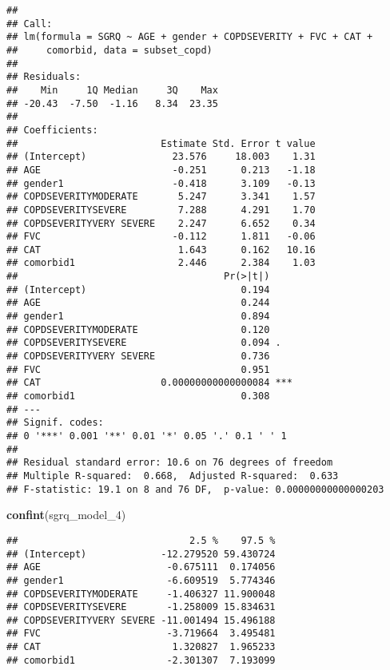\documentclass[
]{article}
\newenvironment{Shaded}{\begin{snugshade}}{\end{snugshade}}
\newcommand{\FunctionTok}[1]{\textcolor[rgb]{0.13,0.29,0.53}{\textbf{#1}}}
\newcommand{\NormalTok}[1]{#1}
\begin{document}
\begin{verbatim}
## 
## Call:
## lm(formula = SGRQ ~ AGE + gender + COPDSEVERITY + FVC + CAT + 
##     comorbid, data = subset_copd)
## 
## Residuals:
##    Min     1Q Median     3Q    Max 
## -20.43  -7.50  -1.16   8.34  23.35 
## 
## Coefficients:
##                         Estimate Std. Error t value
## (Intercept)               23.576     18.003    1.31
## AGE                       -0.251      0.213   -1.18
## gender1                   -0.418      3.109   -0.13
## COPDSEVERITYMODERATE       5.247      3.341    1.57
## COPDSEVERITYSEVERE         7.288      4.291    1.70
## COPDSEVERITYVERY SEVERE    2.247      6.652    0.34
## FVC                       -0.112      1.811   -0.06
## CAT                        1.643      0.162   10.16
## comorbid1                  2.446      2.384    1.03
##                                    Pr(>|t|)    
## (Intercept)                           0.194    
## AGE                                   0.244    
## gender1                               0.894    
## COPDSEVERITYMODERATE                  0.120    
## COPDSEVERITYSEVERE                    0.094 .  
## COPDSEVERITYVERY SEVERE               0.736    
## FVC                                   0.951    
## CAT                     0.00000000000000084 ***
## comorbid1                             0.308    
## ---
## Signif. codes:  
## 0 '***' 0.001 '**' 0.01 '*' 0.05 '.' 0.1 ' ' 1
## 
## Residual standard error: 10.6 on 76 degrees of freedom
## Multiple R-squared:  0.668,  Adjusted R-squared:  0.633 
## F-statistic: 19.1 on 8 and 76 DF,  p-value: 0.00000000000000203
\end{verbatim}

\begin{Shaded}
\begin{Highlighting}[]
\FunctionTok{confint}\NormalTok{(sgrq\_model\_4)}
\end{Highlighting}
\end{Shaded}

\begin{verbatim}
##                              2.5 %    97.5 %
## (Intercept)             -12.279520 59.430724
## AGE                      -0.675111  0.174056
## gender1                  -6.609519  5.774346
## COPDSEVERITYMODERATE     -1.406327 11.900048
## COPDSEVERITYSEVERE       -1.258009 15.834631
## COPDSEVERITYVERY SEVERE -11.001494 15.496188
## FVC                      -3.719664  3.495481
## CAT                       1.320827  1.965233
## comorbid1                -2.301307  7.193099
\end{verbatim}
\end{document}
